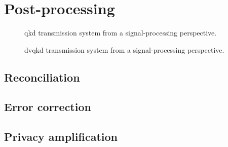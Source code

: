 \section{Post-processing}



\begin{figure}[htb]
	\centering
	
	\caption{\Gls{qkd} transmission system from a signal-processing perspective.}
\end{figure}

\begin{figure}[htb]
	\centering
	
	\caption{\Gls{dvqkd} transmission system from a signal-processing perspective.}
\end{figure}

\subsection{Reconciliation}


\subsection{Error correction}


\subsection{Privacy amplification}

